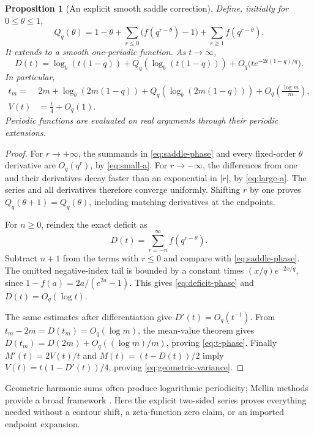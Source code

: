 \documentclass[11pt,a4paper]{article}
\numberwithin{equation}{section}
\newtheorem{proposition}[theorem]{Proposition}
\theoremstyle{definition}
\theoremstyle{remark}
\begin{document}
\begin{proposition}[An explicit smooth saddle correction]
\label{prop:saddle-phase}
Define, initially for $0\le\theta\le1$,
\begin{equation}
Q_q(\theta)=1-\theta
 +\sum_{r\le0}\bigl(f(q^{r-\theta})-1\bigr)
 +\sum_{r\ge1}f(q^{r-\theta}).
\label{eq:saddle-phase}
\end{equation}
It extends to a smooth one-periodic function. As $t\to\infty$,
\begin{equation}
D(t)=\log_b(t(1-q))+Q_q(\log_b(t(1-q)))
 +O_q\bigl(t e^{-2t(1-q)/q}\bigr).
\label{eq:deficit-phase}
\end{equation}
In particular,
\begin{align}
t_m={}&2m+\log_b(2m(1-q))
 +Q_q(\log_b(2m(1-q)))
 +O_q\left(\frac{\log m}{m}\right),
\label{eq:t-phase}\\
V(t)&=\frac t4+O_q(1).
\label{eq:geometric-variance}
\end{align}
Periodic functions are evaluated on real arguments through their periodic
extensions.
\end{proposition}
\begin{proof}
For $r\to+\infty$, the summands in \cref{eq:saddle-phase} and every
fixed-order $\theta$ derivative are $O_q(q^r)$, by
\cref{eq:small-a}. For $r\to-\infty$, the differences from one and
their derivatives decay faster than an exponential in $|r|$, by
\cref{eq:large-a}. The series and all derivatives therefore converge
uniformly. Shifting $r$ by one proves $Q_q(\theta+1)=Q_q(\theta)$,
including matching derivatives at the endpoints.

For $n\ge0$, reindex the exact deficit as
\[
D(t)=\sum_{r=-n}^{\infty}f(q^{r-\theta}).
\]
Subtract $n+1$ from the terms with $r\le0$ and compare with
\cref{eq:saddle-phase}. The omitted negative-index tail is bounded by
a constant times $(x/q)e^{-2x/q}$, since $1-f(a)=2a/(e^{2a}-1)$.
This gives \cref{eq:deficit-phase} and $D(t)=O_q(\log t)$.

The same estimates after differentiation give $D'(t)=O_q(t^{-1})$.
From $t_m-2m=D(t_m)=O_q(\log m)$, the mean-value theorem gives
$D(t_m)=D(2m)+O_q((\log m)/m)$, proving \cref{eq:t-phase}.
Finally $M'(t)=2V(t)/t$ and $M(t)=(t-D(t))/2$ imply
$V(t)=t(1-D'(t))/4$, proving \cref{eq:geometric-variance}.
\end{proof}

Geometric harmonic sums often produce logarithmic periodicity; Mellin
methods provide a broad framework \cite{flajolet-gourdon-dumas}. Here the
explicit two-sided series proves everything needed without a contour
shift, a zeta-function zero claim, or an imported endpoint expansion.
\end{document}
